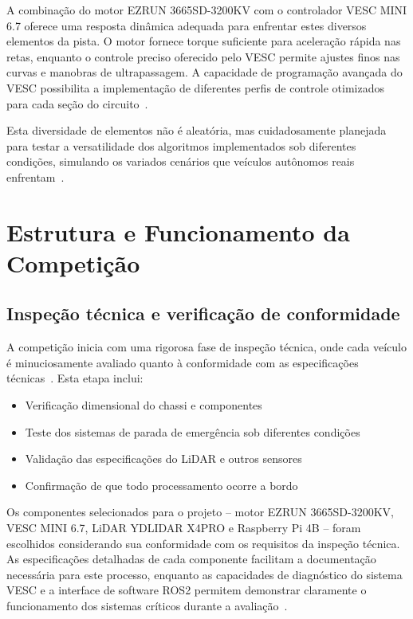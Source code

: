 A combinação do motor EZRUN 3665SD-3200KV com o controlador VESC MINI 6.7
oferece uma resposta dinâmica adequada para enfrentar estes diversos elementos
da pista. O motor fornece torque suficiente para aceleração rápida nas retas,
enquanto o controle preciso oferecido pelo VESC permite ajustes finos nas
curvas e manobras de ultrapassagem. A capacidade de programação avançada do
VESC possibilita a implementação de diferentes perfis de controle otimizados
para cada seção do circuito~\cite{BalachandranF1TENTH2020}.

Esta diversidade de elementos não é aleatória, mas cuidadosamente planejada
para testar a versatilidade dos algoritmos implementados sob diferentes
condições, simulando os variados cenários que veículos autônomos reais
enfrentam~\cite{BalachandranF1TENTH2020}.

\section{Estrutura e Funcionamento da Competição}

\subsection{Inspeção técnica e verificação de conformidade}

A competição inicia com uma rigorosa fase de inspeção técnica, onde cada
veículo é minuciosamente avaliado quanto à conformidade com as especificações
técnicas~\cite{F1TENTHRules2023}. Esta etapa inclui:

\begin{itemize}
      \item Verificação dimensional do chassi e componentes
      \item Teste dos sistemas de parada de emergência sob diferentes condições
      \item Validação das especificações do LiDAR e outros sensores
      \item Confirmação de que todo processamento ocorre a bordo
\end{itemize}

Os componentes selecionados para o projeto – motor EZRUN 3665SD-3200KV, VESC
MINI 6.7, LiDAR YDLIDAR X4PRO e Raspberry Pi 4B – foram escolhidos considerando
sua conformidade com os requisitos da inspeção técnica. As especificações
detalhadas de cada componente facilitam a documentação necessária para este
processo, enquanto as capacidades de diagnóstico do sistema VESC e a interface
de software ROS2 permitem demonstrar claramente o funcionamento dos sistemas
críticos durante a avaliação~\cite{F1TENTHRules2023}.

